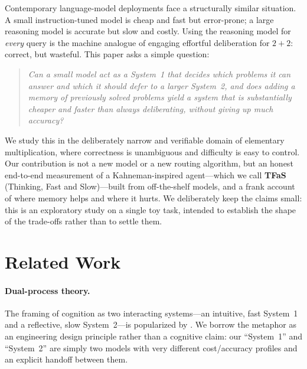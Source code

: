 \documentclass[11pt]{article}
\newcommand{\sysone}{System~1}
\newcommand{\systwo}{System~2}
\begin{document}
Contemporary language-model deployments face a structurally similar situation.
A small instruction-tuned model is cheap and fast but error-prone; a large
reasoning model is accurate but slow and costly. Using the reasoning model for
\emph{every} query is the machine analogue of engaging effortful deliberation
for $2+2$: correct, but wasteful. This paper asks a simple question:

\begin{quote}
\emph{Can a small model act as a System~1 that decides which problems it can
answer and which it should defer to a larger System~2, and does adding a memory
of previously solved problems yield a system that is substantially cheaper and
faster than always deliberating, without giving up much accuracy?}
\end{quote}

We study this in the deliberately narrow and verifiable domain of elementary
multiplication, where correctness is unambiguous and difficulty is easy to
control. Our contribution is not a new model or a new routing algorithm, but an
honest end-to-end measurement of a Kahneman-inspired agent---which we call
\textbf{TFaS} (Thinking, Fast and Slow)---built from off-the-shelf models, and a
frank account of where memory helps and where it hurts. We deliberately keep the
claims small: this is an exploratory study on a single toy task, intended to
establish the shape of the trade-offs rather than to settle them.

\section{Related Work}
\label{sec:related}

\paragraph{Dual-process theory.} The framing of cognition as two interacting
systems---an intuitive, fast System~1 and a reflective, slow System~2---is
popularized by \citet{kahneman2011}. We borrow the metaphor as an engineering
design principle rather than a cognitive claim: our ``\sysone'' and ``\systwo''
are simply two models with very different cost/accuracy profiles and an explicit
handoff between them.
\end{document}
